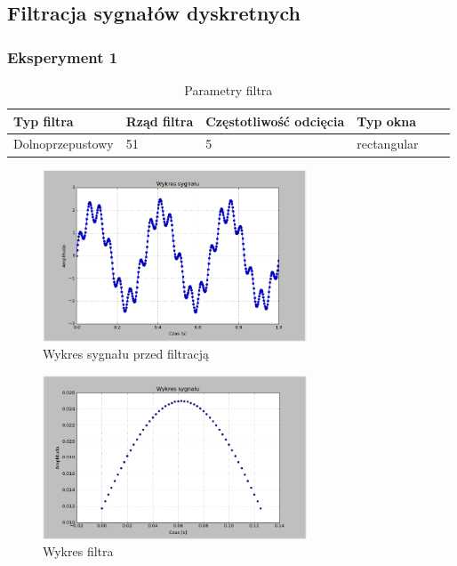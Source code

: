 \documentclass{article}
\begin{document}
    \subsection{Filtracja sygnałów dyskretnych} {
        \subsubsection{Eksperyment 1} {
            \begin{table}[h!]
            \centering
            \begin{tabular}{|l|l|l|l|l|l|}
            \hline
            Typ filtra & Rząd filtra & Częstotliwość odcięcia & Typ okna  \\\hline
            Dolnoprzepustowy & 51 & 5 & rectangular     \\\hline
            \end{tabular}
            \caption{Parametry filtra}
            \end{table}
            \begin{figure}[h!]
                \centering
                \includegraphics[width=0.7\textwidth]{img/sig.png}
                \caption{Wykres sygnału przed filtracją}
            \end{figure}
            \begin{figure}[h!]
                \centering
                \includegraphics[width=0.7\textwidth]{img/fil1.png}
                \caption{Wykres filtra}
            \end{figure}

}}
\end{document}

